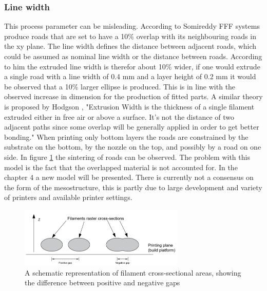 \subsubsection{Line width}
This process parameter can be misleading. According to Somireddy \cite{Somireddy2017MechanicalMesostructure} FFF systems produce roads that are set to have a 10\% overlap with its neighbouring roads in the xy plane. The line width defines the distance between adjacent roads, which could be assumed as nominal line width or the distance between roads. According to him the extruded line width is therefor about 10\% wider, if one would extrude a single road with a line width of 0.4 mm and a layer height of 0.2 mm it would be observed that a 10\% larger ellipse is produced. 
This is in line with the observed increase in dimension for the production of fitted parts. A similar theory is proposed by Hodgson \cite{GaryHodgsonSlic3rMath}, "Extrusion Width is the thickness of a single filament extruded either in free air or above a surface. It's not the distance of two adjacent paths since some overlap will be generally applied in order to get better bonding."
When printing only bottom layers the roads are constrained by the substrate on the bottom, by the nozzle on the top, and possibly by a road on one side.  In figure \ref{fig:roadconnecting} the sintering of roads can be observed. The problem with this model is the fact that the overlapped material is not accounted for. In the chapter 4 a new model will be presented. There is currently not a consensus on the form of the mesostructure, this is partly due to large development and  variety of printers and available printer settings.

\begin{figure}[H]
    \centering
    \includegraphics[width=0.7\textwidth]{chapter_2/figures/roadconnecting.PNG}
    \caption{A schematic representation of filament cross-sectional areas, showing the difference between positive and negative gaps \cite{Cuan-Urquizo2019CharacterizationApproaches}}
    \label{fig:roadconnecting}
\end{figure}

